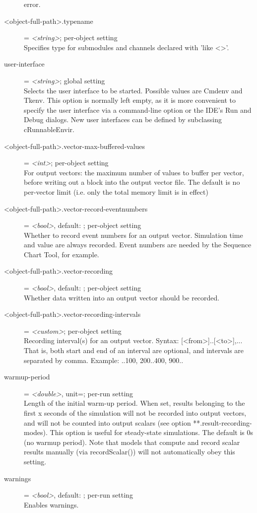 \begin{description}
    error.
\item[<object-full-path>.typename] = \textit{<string>}; per-object setting \\
    Specifies type for submodules and channels declared with 'like <>'.
\item[user-interface] = \textit{<string>}; global setting \\
    Selects the user interface to be started. Possible values are Cmdenv and
    Tkenv. This option is normally left empty, as it is more convenient to
    specify the user interface via a command-line option or the IDE's Run and
    Debug dialogs. New user interfaces can be defined by subclassing
    cRunnableEnvir.
\item[<object-full-path>.vector-max-buffered-values] = \textit{<int>}; per-object setting \\
    For output vectors: the maximum number of values to buffer per vector,
    before writing out a block into the output vector file. The default is no
    per-vector limit (i.e. only the total memory limit is in effect)
\item[<object-full-path>.vector-record-eventnumbers] = \textit{<bool>}, default: ; per-object setting \\
    Whether to record event numbers for an output vector. Simulation time and
    value are always recorded. Event numbers are needed by the Sequence Chart
    Tool, for example.
\item[<object-full-path>.vector-recording] = \textit{<bool>}, default: ; per-object setting \\
    Whether data written into an output vector should be recorded.
\item[<object-full-path>.vector-recording-intervals] = \textit{<custom>}; per-object setting \\
    Recording interval(s) for an output vector. Syntax: [<from>]..[<to>],...
    That is, both start and end of an interval are optional, and intervals are
    separated by comma. Example: ..100, 200..400, 900..
\item[warmup-period] = \textit{<double>}, unit=; per-run setting \\
    Length of the initial warm-up period. When set, results belonging to the
    first x seconds of the simulation will not be recorded into output vectors,
    and will not be counted into output scalars (see option
    **.result-recording-modes). This option is useful for steady-state
    simulations. The default is 0s (no warmup period). Note that models that
    compute and record scalar results manually (via recordScalar()) will not
    automatically obey this setting.
\item[warnings] = \textit{<bool>}, default: ; per-run setting \\
    Enables warnings.
\end{description}

